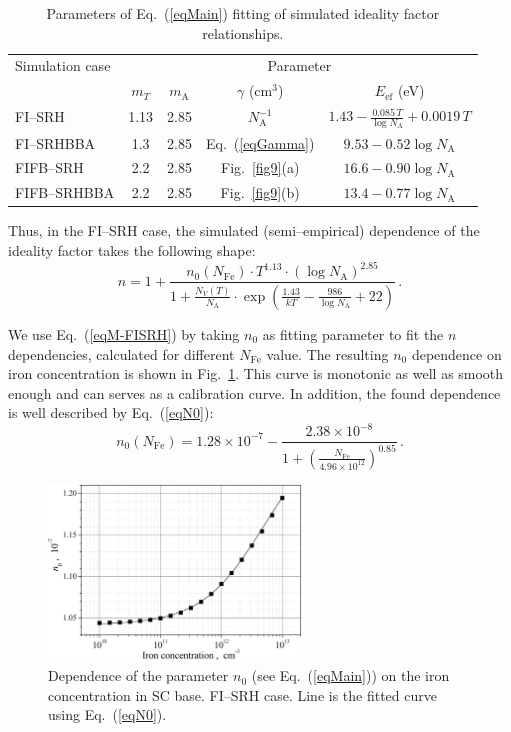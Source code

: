 \documentclass [sort&compress] {elsarticle}
\begin{document}
\begin{table}
\caption{\label{tabEq}Parameters of Eq.~(\ref{eqMain}) fitting of simulated ideality factor relationships.
}
\begin{tabular}{lcccc}
\hline
\hline
Simulation case&\multicolumn{4}{c}{Parameter}\\
&$m_T$&$m_\mathrm{A}$&$\gamma$ (cm$^3$)&$E_\mathrm{ef}$ (eV)\\
\hline
FI--SRH&1.13&2.85&$N_\mathrm{A}^{-1}$&$1.43-\frac{0.085\, T} {\log N_\mathrm{A}}+0.0019 \,T$\\
FI--SRHBBA&1.3&2.85&Eq.~(\ref{eqGamma})&$9.53-0.52\log N_\mathrm{A}$\\
FIFB--SRH&2.2&2.85&Fig.~\ref{fig9}(a)&$16.6-0.90\log N_\mathrm{A}$\\
FIFB--SRHBBA&2.2&2.85&Fig.~\ref{fig9}(b)&$13.4-0.77\log N_\mathrm{A}$\\
\hline
\hline
\end{tabular}
\end{table}


Thus, in the FI--SRH case, the simulated (semi--empirical) dependence of the ideality factor takes the following shape:
\begin{equation}
\label{eqM-FISRH}
    n=1+\frac{n_0(N_\mathrm{Fe})\cdot T^{1.13}\cdot(\log N_\mathrm{A})^{2.85}}
        {1+\frac{N_V(T)}{N_\mathrm{A}}\cdot\exp\left(\frac{1.43}{kT}-\frac{986}{\log N_\mathrm{A}}+22\right)}\,.
\end{equation}

We use Eq.~(\ref{eqM-FISRH}) by taking $n_0$ as fitting parameter to fit the $n$ dependencies, calculated for different $N_\mathrm{Fe}$ value.
The resulting $n_0$ dependence on iron concentration is shown in Fig.~\ref{fig4}.
This curve is monotonic as well as  smooth enough and can serves as a calibration curve.
In addition, the found dependence is well described by Eq.~(\ref{eqN0}):
\begin{equation}
\label{eqN0}
    n_0(N_\mathrm{Fe})=1.28\times10^{-7}-\frac{2.38\times10^{-8}}{1+\left(\frac{N_\mathrm{Fe}}{4.96\times10^{12}}\right)^{0.85}}\,.
\end{equation}

\begin{figure}
\includegraphics[width=0.6\textwidth]{Fig4}%
\caption{\label{fig4}
Dependence of the parameter $n_0$ (see Eq.~(\ref{eqMain})) on the iron concentration in SC base.
FI--SRH case.
Line is the fitted curve using Eq.~(\ref{eqN0}).
}%
\end{figure}
\end{document}
